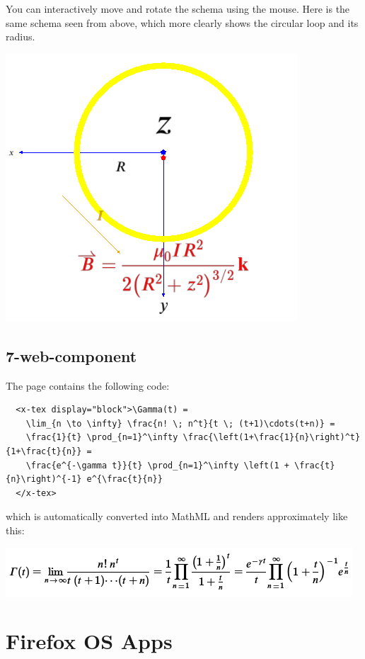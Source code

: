 You can interactively move and rotate the schema using the mouse. Here is the
same schema seen from above, which more clearly shows the circular loop and its
radius.

\href{http://fred-wang.github.io/MathUI2014/demos/6-mathml-in-webgl}{\includegraphics{screenshots/6-mathml-in-webgl-2}}

\subsection{7-web-component}

The page contains the following code:

\begin{verbatim}
  <x-tex display="block">\Gamma(t) =
    \lim_{n \to \infty} \frac{n! \; n^t}{t \; (t+1)\cdots(t+n)} =
    \frac{1}{t} \prod_{n=1}^\infty \frac{\left(1+\frac{1}{n}\right)^t}{1+\frac{t}{n}} =
    \frac{e^{-\gamma t}}{t} \prod_{n=1}^\infty \left(1 + \frac{t}{n}\right)^{-1} e^{\frac{t}{n}}
  </x-tex>
\end{verbatim}

which is automatically converted into MathML and renders approximately like
this:

\href{http://fred-wang.github.io/MathUI2014/demos/7-web-component}{\includegraphics{screenshots/7-web-component}}

\section{Firefox OS Apps}

